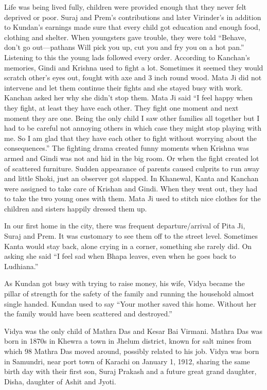 Life was being lived fully, children were provided  enough that they never felt deprived or poor. Suraj and Prem's contributions and later Virinder's in addition to  Kundan's earnings made sure that every child got education and enough food, clothing and shelter. When youngsters gave trouble, they were told “Behave, don’t go out—pathans Will pick you up, cut you and fry you on a hot pan.” Listening to this the young lads followed every order. According to Kanchan’s memories, Gindi and Krishna used to fight a lot. Sometimes it seemed they would scratch other’s eyes out, fought with axe and 3 inch round wood. Mata Ji did not intervene and let them continue their fights and she stayed busy with work. Kanchan asked her why she didn’t stop them. 
Mata Ji said “I feel happy when they fight, at least they have each other. They fight one moment and next moment they are one. Being the only child I saw other families all together but I had to be careful not annoying others in which case they might stop playing with me. So I am glad that they have each other to fight without worrying about the consequences.” The fighting drama created funny moments when Krishna was armed and Gindi was not and hid in the big room. Or when the fight created lot of scattered furniture. Sudden appearance of parents caused culprits to run away and little Shoki, just an observer got slapped. In Khanewal, Kanta and Kanchan were assigned to take care of Krishan and Gindi. When they went out, they had to take the two young ones with them. Mata Ji used to stitch nice clothes for the children and sisters happily dressed them up. 

In our first home in the city, there was frequent departure/arrival of Pita Ji, Suraj and Prem. It was customary to see them off to the street level. Sometimes Kanta would stay back, alone crying in a corner, something she rarely did. On asking she said “I feel sad when Bhapa leaves, even when he goes back to Ludhiana.”

As Kundan got busy with trying to raise money, his wife, Vidya became the pillar of strength for the safety of the family and running the household almost single handed.  Kundan used to say “Your mother saved this home. Without her the family would have been scattered and destroyed.” 

Vidya was the only child of Mathra Das and Kesar Bai Virmani. Mathra Das was born in 1870s in Khewra a town in Jhelum district, known for salt mines from which 98%
Mathra Das moved around, possibly related to his job. Vidya was born in Samundri, near port town of Karachi on January 1, 1912, sharing the same birth day with their first son, Suraj Prakash and a future great grand daughter, Disha, daughter of Ashit and Jyoti. 

